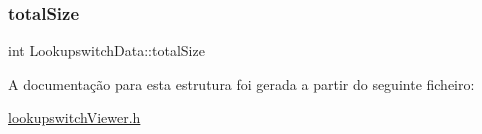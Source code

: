 \subsubsection{\texorpdfstring{total\+Size}{totalSize}}
{\footnotesize\ttfamily int Lookupswitch\+Data\+::total\+Size}



A documentação para esta estrutura foi gerada a partir do seguinte ficheiro\+:\begin{DoxyCompactItemize}
\item 
\hyperlink{lookupswitch_viewer_8h}{lookupswitch\+Viewer.\+h}\end{DoxyCompactItemize}

